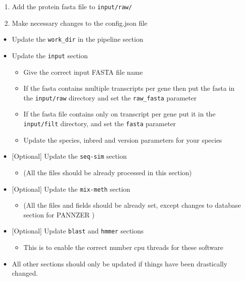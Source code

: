 \documentclass[11pt,letterpaper]{article}
\begin{document}
\begin{enumerate}
 \def\labelenumi{\arabic{enumi}.}

 \item
       Add the protein fasta file to \texttt{input/raw/}
 \item
       Make necessary changes to the config.json file
\end{enumerate}

\begin{itemize}

 \item
       Update the \texttt{work\_dir} in the pipeline section
 \item
       Update the \texttt{input} section

       \begin{itemize}

        \item
              Give the correct input FASTA file name
        \item
              If the fasta contains multiple transcripts per gene then put the
              fasta in the \texttt{input/raw} directory and set the
              \texttt{raw\_fasta} parameter
        \item
              If the fasta file contains only on transcript per gene put it in the
              \texttt{input/filt} directory, and set the \texttt{fasta} parameter
        \item
              Update the species, inbred and version parameters for your species
       \end{itemize}
 \item
       {[}Optional{]} Update the \texttt{seq-sim} section

       \begin{itemize}

        \item
              (All the files should be already processed in this section)
       \end{itemize}
 \item
       {[}Optional{]} Update the \texttt{mix-meth} section

       \begin{itemize}

        \item
              (All the files and fields should be already set, except changes to
              database section for PANNZER )
       \end{itemize}
 \item
       {[}Optional{]} Update \texttt{blast} and \texttt{hmmer} sections

       \begin{itemize}

        \item
              This is to enable the correct number cpu threads for these software
       \end{itemize}
 \item
       All other sections should only be updated if things have been
       drastically changed.
\end{itemize}
\end{document}
